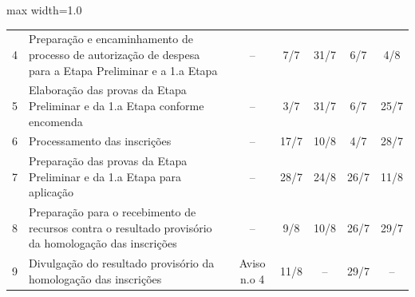 \begin{quadro}[htb]
\begin{adjustbox}{max width=1.0\linewidth}
\begin{tabular}{|c|l|c|c|c|c|c|}
4  & Preparação e   encaminhamento de processo de autorização de despesa para a Etapa Preliminar   e a 1.a Etapa                                & –                   & 7/7                                                                             & 31/7                                  & 6/7                                                                             & 4/8                  \\
\rowcolor[HTML]{FCD5B4} 
5  & Elaboração das provas   da Etapa Preliminar e da 1.a Etapa conforme encomenda                                                              & –                   & 3/7                                                                             & 31/7                                  & 6/7                                                                             & 25/7                 \\
6  & Processamento das   inscrições                                                                                                             & –                   & 17/7                                                                            & 10/8                                  & 4/7                                                                             & 28/7                 \\
7  & Preparação das provas   da Etapa Preliminar e da 1.a Etapa para aplicação                                                                  & –                   & 28/7                                                                            & 24/8                                  & 26/7                                                                            & 11/8                 \\
8  & Preparação para o   recebimento de recursos contra o resultado provisório da homologação das   inscrições                                  & –                   & 9/8                                                                             & 10/8                                  & 26/7                                                                            & 29/7                 \\
\rowcolor[HTML]{92CDDC} 
9  & Divulgação do   resultado provisório da homologação das inscrições                                                                         & Aviso n.o 4         & 11/8                                                                            & –                                     & 29/7                                                                            & –                    \\

\end{tabular}
\end{adjustbox}
\end{quadro}
